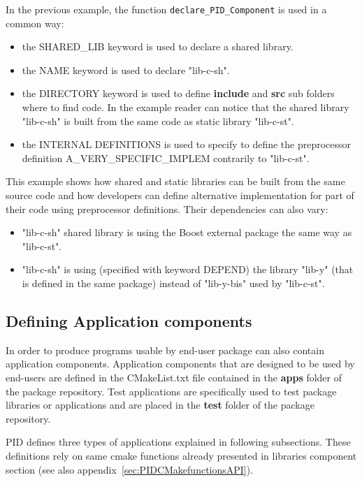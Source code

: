 \documentclass[12pt,a4paper]{article}
\begin{document}
In the previous example, the function \texttt{declare\_PID\_Component} is used in a common way:
\begin{itemize}
\item the SHARED\_LIB keyword is used to declare a shared library.
\item the NAME keyword is used to declare "lib-c-sh".
\item the DIRECTORY keyword is used to define \textbf{include} and \textbf{src} sub folders where to find code. In the example reader can notice that the shared library "lib-c-sh" is built from the same code as static library "lib-c-st".
\item the INTERNAL DEFINITIONS is used to specify to define the preprocessor definition A\_VERY\_SPECIFIC\_IMPLEM contrarily to "lib-c-st".
\end{itemize}

This example shows how shared and static libraries can be built from the same source code and how developers can define alternative implementation for part of their code using preprocessor definitions. Their dependencies can also vary:
\begin{itemize}
\item "lib-c-sh" shared library is using the Boost external package the same way as "lib-c-st".
\item "lib-c-sh" is using (specified with keyword DEPEND) the library "lib-y" (that is defined in the same package)  instead of "lib-y-bis" used by "lib-c-st".
\end{itemize}


\subsection{Defining Application components}
\label{sec:appCMake}

In order to produce programs usable by end-user package can also contain application components. Application components that are designed to be used by end-users are defined in the CMakeList.txt file contained in the \textbf{apps} folder of the package repository. Test applications are specifically used to test package libraries or applications and are placed in the \textbf{test} folder of the package repository.

PID defines three types of applications explained in following subsections. These definitions rely on same cmake functions already presented in libraries component section (see also appendix~\ref{sec:PIDCMakefunctionsAPI}).
\end{document}
